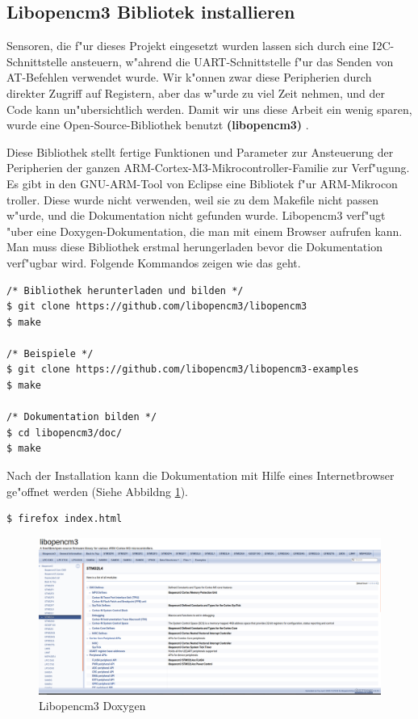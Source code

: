 \subsection{Libopencm3 Bibliotek installieren}
Sensoren, die f"ur dieses Projekt eingesetzt wurden lassen sich durch 
eine I2C-Schnittstelle ansteuern, w"ahrend die UART-Schnittstelle f"ur 
das Senden von AT-Befehlen verwendet wurde. Wir k"onnen zwar diese 
Peripherien durch direkter Zugriff auf Registern, aber das w"urde zu 
viel Zeit nehmen, und der Code kann un"ubersichtlich werden. Damit wir 
uns diese Arbeit ein wenig sparen, wurde eine Open-Source-Bibliothek 
benutzt \textbf{(libopencm3)} \cite{lib}. 

\vspace{1cm}
Diese Bibliothek stellt fertige Funktionen und Parameter zur 
Ansteuerung der Peripherien der ganzen 
ARM-Cortex-M3-Mikrocontroller-Familie zur Verf"ugung. 
Es gibt in den GNU-ARM-Tool von Eclipse eine Bibliotek f"ur ARM-Mikrocon
troller. Diese wurde nicht verwenden, weil sie zu dem Makefile nicht 
passen w"urde, und die Dokumentation nicht gefunden wurde. Libopencm3 
verf"ugt "uber eine Doxygen-Dokumentation, die man mit einem Browser 
aufrufen kann. Man muss diese Bibliothek erstmal herungerladen bevor 
die Dokumentation verf"ugbar wird. Folgende Kommandos zeigen wie das 
geht.

\begin{lstlisting}[frame=single]
/* Bibliothek herunterladen und bilden */
$ git clone https://github.com/libopencm3/libopencm3 
$ make

/* Beispiele */
$ git clone https://github.com/libopencm3/libopencm3-examples 
$ make

/* Dokumentation bilden */
$ cd libopencm3/doc/ 
$ make 

\end{lstlisting}

Nach der Installation kann die Dokumentation mit Hilfe eines 
Internetbrowser ge"offnet werden (Siehe Abbildng \ref{fig:Lib}).
\begin{lstlisting}[frame=single]
$ firefox index.html 
\end{lstlisting}

\begin{figure}[h]
	\centering
	\includegraphics[width=16cm]{source/images/Lib}
	\caption{Libopencm3 Doxygen\label{fig:Lib}}
\end{figure}

